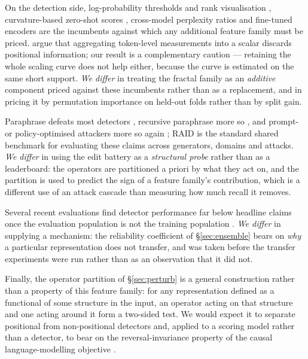 \documentclass{article}
\begin{document}
On the detection side, log-probability thresholds and rank visualisation
\citep{gehrmann2019gltr}, curvature-based zero-shot scores
\citep{mitchell2023detectgpt,bao2024fastdetectgpt}, cross-model perplexity ratios
\citep{hans2024binoculars} and fine-tuned encoders are the incumbents against
which any additional feature family must be priced.
\citet{west2025nonstationary} argue that aggregating token-level measurements into
a scalar discards positional information; our result is a complementary caution
--- retaining the whole scaling curve does not help either, because the curve is
estimated on the same short support. \emph{We differ} in treating the fractal
family as an \emph{additive} component priced against these incumbents rather than
as a replacement, and in pricing it by permutation importance on held-out folds
rather than by split gain.

Paraphrase defeats most detectors \citep{krishna2023paraphrasing}, recursive
paraphrase more so \citep{sadasivan2023canai}, and prompt- or policy-optimised
attackers more so again \citep{lu2024sico,cheng2025adversarialpara}; RAID
\citep{dugan2024raid} is the standard shared benchmark for evaluating these claims
across generators, domains and attacks. \emph{We differ} in using the edit battery
as a \emph{structural probe} rather than as a leaderboard: the operators are
partitioned a priori by what they act on, and the partition is used to predict the
sign of a feature family's contribution, which is a different use of an attack
cascade than measuring how much recall it removes.

Several recent evaluations find detector performance far below headline claims
once the evaluation population is not the training population
\citep{tufts2024practical,dugan2024raid}. \emph{We differ} in supplying a
mechanism: the reliability coefficient of \S\ref{sec:ensemble} bears on \emph{why}
a particular representation does not transfer, and was taken before the transfer
experiments were run rather than as an observation that it did not.

Finally, the operator partition of \S\ref{sec:perturb} is a general construction
rather than a property of this feature family: for any representation defined as a
functional of some structure in the input, an operator acting on that structure and
one acting around it form a two-sided test. We would expect it to separate
positional from non-positional detectors
\citep{west2025nonstationary,lacava2026luminol} and, applied to a scoring model
rather than a detector, to bear on the reversal-invariance property of the causal
language-modelling objective \citep{sahasrabudhe2025reversal}.
\end{document}
